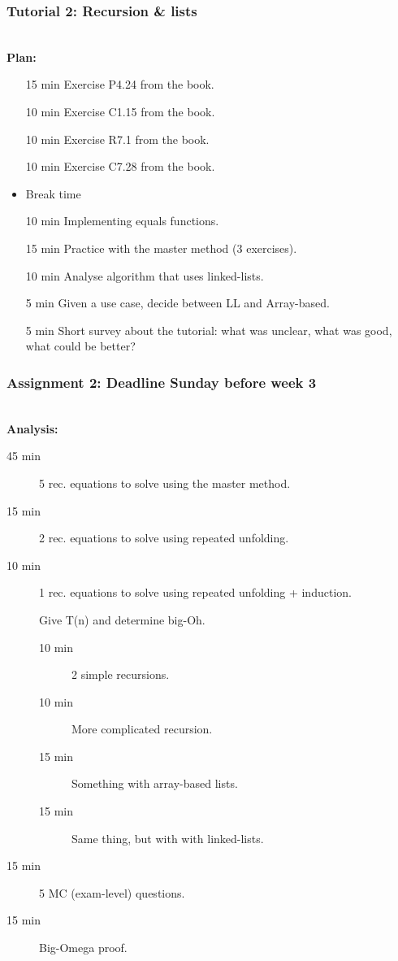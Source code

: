 \newpage
\subsubsection{Tutorial 2: Recursion \& lists}
\label{ssub:tutorial_1_complexity_notation_space_complexity}

\hfill\\
\textbf{Plan:}\\
\begin{itemize}
	\item[15 min] Exercise P4.24 from the book.
	\item[10 min] Exercise C1.15 from the book.
	\item[10 min] Exercise R7.1 from the book.
	\item[10 min] Exercise C7.28 from the book.
	\item Break time
	\item[10 min] Implementing equals functions.
	\item[15 min] Practice with the master method (3 exercises).
	\item[10 min] Analyse algorithm that uses linked-lists.
	\item[5 min] Given a use case, decide between LL and Array-based.
	\item[5 min] Short survey about the tutorial: what was unclear, what was good, what could be better?
\end{itemize}


\newpage
\subsubsection{Assignment 2: Deadline Sunday before week 3}
\label{ssub:assignment_2}

\hfill\\
\textbf{Analysis:}\\
\begin{description}
	\item[45 min] 5 rec. equations to solve using the master method.
	\item[15 min] 2 rec. equations to solve using repeated unfolding.
	\item[10 min] 1 rec. equations to solve using repeated unfolding + induction.
	\item[] Give T(n) and determine big-Oh. 
		\begin{description}
			\item[10 min] 2 simple recursions.
			\item[10 min] More complicated recursion.
			\item[15 min] Something with array-based lists.
			\item[15 min] Same thing, but with with linked-lists.
		\end{description}
	\item[15 min] 5 MC (exam-level) questions.
	\item[15 min] Big-Omega proof.
\end{description}

